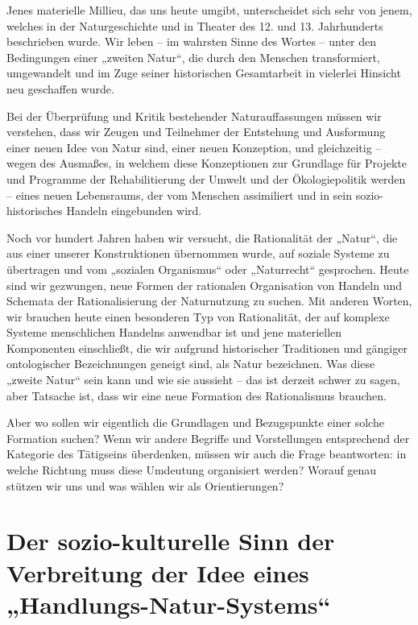 \documentclass[11pt,a4paper]{article}
\begin{document}
Jenes materielle Millieu, das uns heute umgibt, unterscheidet sich sehr von
jenem, welches in der Naturgeschichte und in Theater des 12. und
13. Jahrhunderts beschrieben wurde. Wir leben -- im wahrsten Sinne des Wortes
-- unter den Bedingungen einer „zweiten Natur“, die durch den Menschen
transformiert, umgewandelt und im Zuge seiner historischen Gesamtarbeit in
vielerlei Hinsicht neu geschaffen wurde.

Bei der Überprüfung und Kritik bestehender Naturauf\-fassungen müssen wir
verstehen, dass wir Zeugen und Teilnehmer der Entstehung und Ausformung einer
neuen Idee von Natur sind, einer neuen Konzeption, und gleichzeitig -- wegen
des Ausmaßes, in welchem diese Konzeptionen zur Grundlage für Projekte und
Programme der Rehabilitierung der Umwelt und der Ökologiepolitik werden --
eines neuen Lebensraums, der vom Menschen assimiliert und in sein
sozio-historisches Handeln eingebunden wird.

Noch vor hundert Jahren haben wir versucht, die Rationalität der „Natur“, die
aus einer unserer Konstruktionen übernommen wurde, auf soziale Systeme zu
übertragen und vom „sozialen Organismus“ oder „Naturrecht“ gesprochen. Heute
sind wir gezwungen, neue Formen der rationalen Organisation von Handeln und
Schemata der Rationalisierung der Naturnutzung zu suchen. Mit anderen Worten,
wir brauchen heute einen besonderen Typ von Rationalität, der auf komplexe
Systeme menschlichen Handelns anwendbar ist und jene materiellen Komponenten
einschließt, die wir aufgrund historischer Traditionen und gängiger
ontologischer Bezeichnungen geneigt sind, als Natur bezeichnen. Was diese
„zweite Natur“ sein kann und wie sie aussieht -- das ist derzeit schwer zu
sagen, aber Tatsache ist, dass wir eine neue Formation des Rationalismus
brauchen.

Aber wo sollen wir eigentlich die Grundlagen und Bezugspunkte einer solche
Formation suchen? Wenn wir andere Begriffe und Vorstellungen entsprechend der
Kategorie des Tätigseins überdenken, müssen wir auch die Frage beantworten: in
welche Richtung muss diese Umdeutung organisiert werden? Worauf genau
stützen wir uns und was wählen wir als Orientierungen?

\section{Der sozio-kulturelle Sinn der Verbreitung der Idee eines
  „Handlungs-Natur-Systems“}
\end{document}
